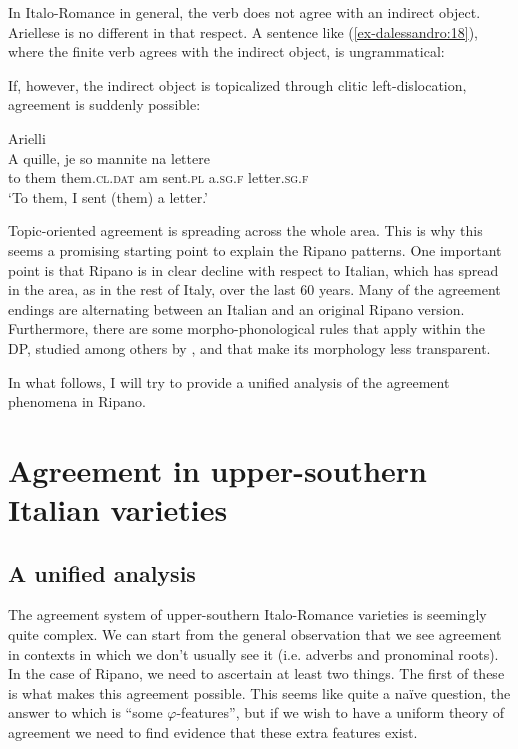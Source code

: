 \documentclass[output=paper
,modfonts
,nonflat]{langsci/langscibook}
\begin{document}
In Italo-Romance in general, the verb does not agree with an indirect object. Ariellese is no different in that respect. A sentence like (\ref{ex-dalessandro:18}), where the finite verb agrees with the indirect object, is ungrammatical:

\begin{exe}
 \label{ex-dalessandro:18}
\end{exe}
If, however, the indirect object is topicalized through clitic left-dislocation, agreement is suddenly possible:

\begin{exe}
\ex Arielli\\
\gll A quille, je   so mannite   na   lettere\\
to them  them.\textsc{cl.dat} am sent.\textsc{pl} a.\textsc{sg.f} letter.\textsc{sg.f}\\
\glt `To them, I sent (them) a letter.'
\end{exe}
Topic-oriented agreement is spreading across the whole area. This is why this seems a promising starting point to explain the Ripano patterns. One important point is that Ripano is in clear decline with respect to Italian, which has spread in the area, as in the rest of Italy, over the last 60 years. Many of the agreement endings are alternating between an Italian and an original Ripano version. Furthermore, there are some morpho-phonological rules that apply within the DP, studied among others by \citet{Paciaroni_Loporcaro2018}, and that make its morphology less transparent. 

In what follows, I will try to provide a unified analysis of the agreement phenomena in Ripano.

\section{Agreement in upper-southern Italian varieties} \label{sec-dalessandro:3}
\subsection{A unified analysis} \label{sec-dalessandro:3.1}
The agreement system of upper-southern Italo-Romance varieties is seemingly quite complex. We can start from the general observation that we see agreement in contexts in which we don’t usually see it (i.e. adverbs and pronominal roots). In the case of Ripano, we need to ascertain at least two things. The first of these is what makes this agreement possible. This seems like quite a naïve question, the answer to which is ``some $\varphi $-features'', but if we wish to have a uniform theory of agreement we need to find evidence that these extra features exist.
\end{document}
